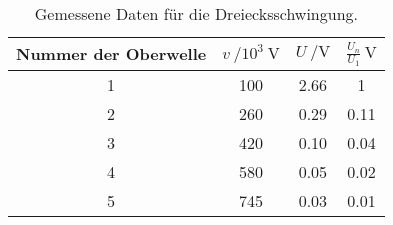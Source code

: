 \begin{table}[H]
  \centering
   \begin{tabular}{c c c c}
    \toprule
    Nummer der Oberwelle & $ v \:/10^{3}\: \si{\volt}$ & $ U\: / \si{\volt} $ &
    $ \frac{U_{n}}{U_{1}} \: \si{\volt} $  \\
    \midrule
    1 & 100 & 2.66 & 1 \\
    2 & 260 & 0.29 & 0.11 \\
    3 & 420 & 0.10 & 0.04 \\
    4 & 580 & 0.05 & 0.02 \\
    5 & 745 & 0.03 & 0.01 \\
    \bottomrule
  \end{tabular}
  \caption{Gemessene Daten für die Dreiecksschwingung.}
  \label{tab:tabe2}
\end{table}
